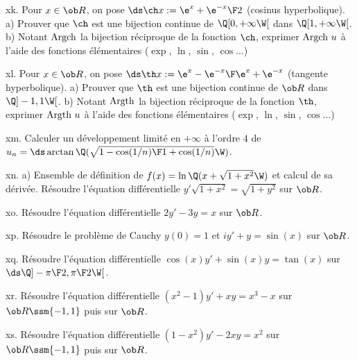 \exo [Level=1,Fight=2,Learn=2,Field=\TrigonométrieHyperbolique,Type=\Cours,Origin=\Lakedaemon] xk. 
Pour $x\in\ob R$, on pose $\ds\ch x:={\e^x+\e^{-x}\F2}$ (cosinus hyperbolique). \pn
a) Prouver que $\ch$ est une bijection continue de $\Q[0,+\infty\W[$ dans $\Q[1,+\infty\W[$. \pn
b) Notant $\hbox{Argch}$ la bijection réciproque de la fonction $\ch$, 
exprimer $\hbox{Argch}\ u$ à l'aide des fonctions élémentaires ($\exp$, 
$\ln$, $\sin$, $\cos$...)

\exo [Level=1,Fight=2,Learn=2,Field=\TrigonométrieHyperbolique,Type=\Cours,Origin=\Lakedaemon]  xl. 
Pour $x\in\ob R$, on pose $\ds\th x:={\e^x-\e^{-x}\F\e^x+\e^{-x}}$ (tangente hyperbolique). \pn
a) Prouver que $\th$ est une bijection continue de $\ob R$ dans $\Q]-1,1\W[$. \pn
b) Notant $\hbox{Argth}$ la bijection réciproque de la fonction $\th$, 
exprimer $\hbox{Argth}\ u$ à l'aide des fonctions élémentaires ($\exp$, 
$\ln$, $\sin$, $\cos$...)

\exo [Level=1,Fight=1,Learn=1,Field=\DéveloppementsLimités,Type=\Exercices,Origin=\MP]  xm. 
Calculer un développement limité en $+\infty$ à l'ordre $4$ de 
$u_n=\ds\arctan\Q(\sqrt{1-\cos(1/n)\F1+\cos(1/n)}\W)$. 

\exo [Level=1,Fight=1,Learn=1,Field=\EquationsDifférentiellesAVariablesSéparables,Type=\Exercices,Origin=] xn. 
a) Ensemble de définition de $f(x)=\ln\Q(x+\sqrt{1+x^2}\W)$ et calcul de sa dérivée. 
Résoudre l'équation différentielle $y'\sqrt{1+x^2}=\sqrt{1+y^2}$ sur $\ob R$.

\exo [Level=1,Fight=0,Learn=0,Field=\EquationsDifférentiellesLinéairesDuPremierOrdre,Type=\Exercices,Origin=] xo. 
Résoudre l'équation différentielle $2y'-3y=x$ sur $\ob R$. 

\exo [Level=1,Fight=0,Learn=0,Field=\EquationsDifférentiellesLinéairesDuPremierOrdre,Type=\Exercices,Origin=] xp. 
Résoudre le problème de Cauchy $y(0)=1$  et $iy'+y=\sin(x)$ sur $\ob R$. 

\exo [Level=1,Fight=0,Learn=0,Field=\EquationsDifférentiellesLinéairesDuPremierOrdre,Type=\Exercices,Origin=]xq. 
Résoudre l'équation différentielle $\cos(x)y'+\sin(x)y=\tan(x)$ sur $\ds\Q]-{\pi\F2},{\pi\F2}\W[$. 

\exo [Level=1,Fight=0,Learn=0,Field=\EquationsDifférentiellesLinéairesDuPremierOrdre,Type=\Exercices,Origin=] xr. 
Résoudre l'équation différentielle $(x^2-1)y'+xy=x^3-x$ sur $\ob R\ssm\{-1,1\}$ puis sur $\ob R$. 

\exo [Level=1,Fight=0,Learn=0,Field=\EquationsDifférentiellesLinéairesDuPremierOrdre,Type=\Exercices,Origin=] xs. 
Résoudre l'équation différentielle $(1-x^2)y'-2xy=x^2$ sur $\ob R\ssm\{-1,1\}$ 
puis sur $\ob R$. 

